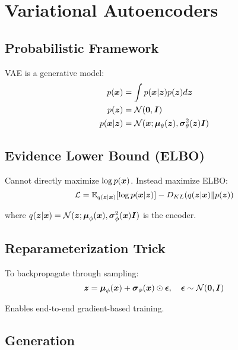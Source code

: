 
\section{Variational Autoencoders }
\label{sec:vae}

\subsection{Probabilistic Framework}

VAE is a generative model:
\begin{align}
p(\boldsymbol{x}) &= \int p(\boldsymbol{x}|\boldsymbol{z}) p(\boldsymbol{z}) d\boldsymbol{z} \\
p(\boldsymbol{z}) &= \mathcal{N}(\boldsymbol{0}, \boldsymbol{I}) \\
p(\boldsymbol{x}|\boldsymbol{z}) &= \mathcal{N}(\boldsymbol{x}; \boldsymbol{\mu}_{\theta}(\boldsymbol{z}), \boldsymbol{\sigma}^2_{\theta}(\boldsymbol{z})\boldsymbol{I})
\end{align}

\subsection{Evidence Lower Bound (ELBO)}

Cannot directly maximize $\log p(\boldsymbol{x})$. Instead maximize ELBO:
\begin{equation}
\mathcal{L} = \mathbb{E}_{q(\boldsymbol{z}|\boldsymbol{x})}[\log p(\boldsymbol{x}|\boldsymbol{z})] - D_{KL}(q(\boldsymbol{z}|\boldsymbol{x}) \| p(\boldsymbol{z}))
\end{equation}

where $q(\boldsymbol{z}|\boldsymbol{x}) = \mathcal{N}(\boldsymbol{z}; \boldsymbol{\mu}_{\phi}(\boldsymbol{x}), \boldsymbol{\sigma}^2_{\phi}(\boldsymbol{x})\boldsymbol{I})$ is the encoder.

\subsection{Reparameterization Trick}

To backpropagate through sampling:
\begin{equation}
\boldsymbol{z} = \boldsymbol{\mu}_{\phi}(\boldsymbol{x}) + \boldsymbol{\sigma}_{\phi}(\boldsymbol{x}) \odot \boldsymbol{\epsilon}, \quad \boldsymbol{\epsilon} \sim \mathcal{N}(\boldsymbol{0}, \boldsymbol{I})
\end{equation}

Enables end-to-end gradient-based training.

\subsection{Generation}

